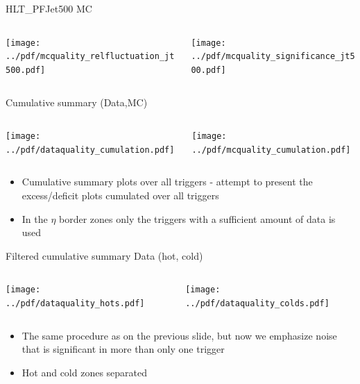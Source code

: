 \documentclass[9pt]{beamer}
\begin{document}
\begin{frame}[t]{HLT\_PFJet500 MC}
\begin{columns}[T]
  \begin{column}{.5\textwidth}
  \texttt{[image: ../pdf/mcquality\_relfluctuation\_jt500.pdf]}
  \end{column}
  \begin{column}{.5\textwidth}
  \texttt{[image: ../pdf/mcquality\_significance\_jt500.pdf]}
  \end{column}
\end{columns}
\end{frame}

\begin{frame}[t]{Cumulative summary (Data,MC)}
\begin{columns}[T]
  \begin{column}{.5\textwidth}
  \texttt{[image: ../pdf/dataquality\_cumulation.pdf]}
  \end{column}
  \begin{column}{.5\textwidth}
  \texttt{[image: ../pdf/mcquality\_cumulation.pdf]}
  \end{column}
\end{columns}
\begin{itemize}
 \item Cumulative summary plots over all triggers - attempt to present the excess/deficit plots cumulated over all triggers
 \item In the $\eta$ border zones only the triggers with a sufficient amount of data is used
\end{itemize}
\end{frame}

\begin{frame}[t]{Filtered cumulative summary Data (hot, cold)}
\begin{columns}[T]
  \begin{column}{.5\textwidth}
  \texttt{[image: ../pdf/dataquality\_hots.pdf]}
  \end{column}
  \begin{column}{.5\textwidth}
  \texttt{[image: ../pdf/dataquality\_colds.pdf]}
  \end{column}
\end{columns}
\begin{itemize}
 \item The same procedure as on the previous slide, but now we emphasize noise that is significant in more than only one trigger
 \item Hot and cold zones separated
\end{itemize}
\end{frame}
\end{document}
